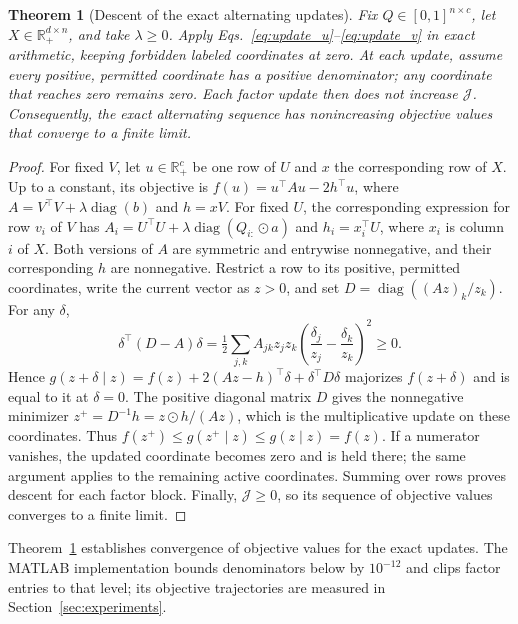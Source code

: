\documentclass[preprint,12pt]{elsarticle}
\newtheorem{theorem}{Theorem}
\theoremstyle{remark}
\newcommand{\R}{\mathbb{R}}
\newcommand{\had}{\odot}
\begin{document}
\begin{theorem}[Descent of the exact alternating updates]
\label{thm:exact_descent}
Fix $Q\in[0,1]^{n\times c}$, let $X\in\R_+^{d\times n}$, and take
$\lambda\ge0$. Apply Eqs.~\eqref{eq:update_u}--\eqref{eq:update_v}
in exact arithmetic, keeping forbidden labeled coordinates at zero.
At each update, assume every positive, permitted coordinate has a
positive denominator; any coordinate that reaches zero remains zero.
Each factor update then does not increase $\mathcal J$. Consequently,
the exact alternating sequence has nonincreasing objective values that
converge to a finite limit.
\end{theorem}
\begin{proof}
For fixed $V$, let $u\in\R_+^c$ be one row of $U$ and $x$ the
corresponding row of $X$. Up to a constant, its objective is
$f(u)=u^\top A u-2h^\top u$, where
$A=V^\top V+\lambda\operatorname{diag}(b)$ and $h=xV$.
For fixed $U$, the corresponding expression for row $v_i$ of $V$ has
$A_i=U^\top U+\lambda\operatorname{diag}(Q_{i:}\had a)$ and
$h_i=x_i^\top U$, where $x_i$ is column $i$ of $X$.
Both versions of $A$ are symmetric and entrywise nonnegative, and
their corresponding $h$ are nonnegative.
Restrict a row to its positive, permitted coordinates, write the
current vector as $z>0$, and set
$D=\operatorname{diag}((Az)_k/z_k)$. For any $\delta$,
\begin{equation*}
\delta^\top(D-A)\delta
=\tfrac12\sum_{j,k}A_{jk}z_jz_k
\left(\frac{\delta_j}{z_j}-\frac{\delta_k}{z_k}\right)^2\ge0.
\end{equation*}
Hence $g(z+\delta\mid z)=f(z)+2(Az-h)^\top\delta+\delta^\top D\delta$
majorizes $f(z+\delta)$ and is equal to it at $\delta=0$.
The positive diagonal matrix $D$ gives the nonnegative minimizer
$z^+=D^{-1}h=z\had h/(Az)$, which is the multiplicative update on
these coordinates. Thus
$f(z^+)\le g(z^+\mid z)\le g(z\mid z)=f(z)$.
If a numerator vanishes, the updated coordinate becomes zero and is
held there; the same argument applies to the remaining active
coordinates. Summing over rows proves descent for each factor block.
Finally, $\mathcal J\ge0$, so its sequence of objective values
converges to a finite limit.
\end{proof}

Theorem~\ref{thm:exact_descent} establishes convergence of objective
values for the exact updates. The MATLAB implementation bounds
denominators below by $10^{-12}$ and clips factor entries to that
level; its objective trajectories are measured in
Section~\ref{sec:experiments}.
\end{document}
